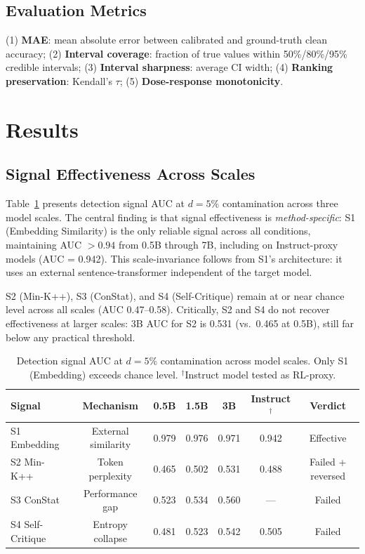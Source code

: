 \documentclass[11pt,a4paper]{article}
\begin{document}
\subsection{Evaluation Metrics}
(1) \textbf{MAE}: mean absolute error between calibrated and ground-truth clean accuracy; (2) \textbf{Interval coverage}: fraction of true values within 50\%/80\%/95\% credible intervals; (3) \textbf{Interval sharpness}: average CI width; (4) \textbf{Ranking preservation}: Kendall's $\tau$; (5) \textbf{Dose-response monotonicity}.

\section{Results}
\label{sec:results}

\subsection{Signal Effectiveness Across Scales}
\label{sec:signal_results}

Table~\ref{tab:signal_auc} presents detection signal AUC at $d=5\%$ contamination across three model scales. The central finding is that signal effectiveness is \emph{method-specific}: S1 (Embedding Similarity) is the only reliable signal across all conditions, maintaining AUC $> 0.94$ from 0.5B through 7B, including on Instruct-proxy models (AUC = 0.942). This scale-invariance follows from S1's architecture: it uses an external sentence-transformer independent of the target model.

S2 (Min-K++), S3 (ConStat), and S4 (Self-Critique) remain at or near chance level across all scales (AUC 0.47--0.58). Critically, S2 and S4 do not recover effectiveness at larger scales: 3B AUC for S2 is 0.531 (vs.\ 0.465 at 0.5B), still far below any practical threshold.

\begin{table}[t]
\centering
\caption{Detection signal AUC at $d=5\%$ contamination across model scales. Only S1 (Embedding) exceeds chance level. $^\dagger$Instruct model tested as RL-proxy.}
\label{tab:signal_auc}
\small
\begin{tabular}{lcccccc}
\toprule
\textbf{Signal} & \textbf{Mechanism} & \textbf{0.5B} & \textbf{1.5B} & \textbf{3B} & \textbf{Instruct$^\dagger$} & \textbf{Verdict} \\
\midrule
S1 Embedding   & External similarity   & 0.979 & 0.976 & 0.971 & 0.942 & Effective \\
S2 Min-K++     & Token perplexity      & 0.465 & 0.502 & 0.531 & 0.488 & Failed + reversed \\
S3 ConStat     & Performance gap       & 0.523 & 0.534 & 0.560 & ---   & Failed \\
S4 Self-Critique & Entropy collapse    & 0.481 & 0.523 & 0.542 & 0.505 & Failed \\
\bottomrule
\end{tabular}
\end{table}
\end{document}
